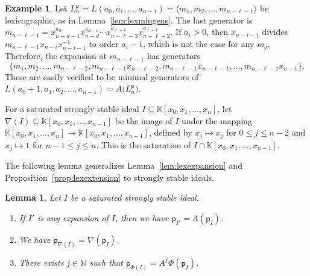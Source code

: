 \documentclass[12pt]{amsart}%
\newtheorem{lemma}[theorem]{Lemma}
\theoremstyle{definition}%
\newtheorem{example}[theorem]{Example}
\newcommand{\hp}{\mathsf{p}}%
\newcommand{\lift}{\Phi}%
\newcommand{\plus}{A}%
\newcommand{\kk}{\mathbb{K}}%
\newcommand{\NN}{\mathbb{N}}%
\begin{document}
\begin{example}%
  \label{eg:lexexpansion}
  Let $L^{\hp}_n = L(a_0, a_1, \dotsc, a_{n-1}) = \langle m_1, m_2,
  \dotsc, m_{n - \ell - 1} \rangle$ be lexicographic, as in
  Lemma~\ref{lem:lexmingens}.  The last generator is $m_{n-\ell-1} =
  x_{n-d-1}^{a_{d}} x_{n-d}^{a_{d-1}} \dotsb x_{n-\ell-3}^{a_{\ell+2}}
  x_{n-\ell-2}^{a_{\ell+1}}$.  If $a_i > 0$, then $x_{n-i-1}$ divides
  $m_{n-\ell-1} x_{n-i} x_{n-i-1}^{-1}$ to order $a_i - 1$, which is
  not the case for any $m_j$.  Therefore, the expansion at
  $m_{n-\ell-1}$ has generators
  \[
  \{ m_1, m_2, \dotsc, m_{n-\ell-2}, m_{n-\ell-1} x_{n-\ell-2},
  m_{n-\ell-1} x_{n-\ell-1}, \dotsc, m_{n-\ell-1} x_{n-1} \}.
  \]
  These are easily verified to be minimal generators of $L(a_0 + 1,
  a_1, a_2, \dotsc, a_{n-1}) = \plus \bigl( L^{\hp}_n \bigr)$.
\end{example}

For a saturated strongly stable ideal $I \subseteq \kk[x_0, x_1,
  \dotsc, x_n]$, let $\nabla \left( I \right) \subseteq \kk[x_0, x_1,
  \dotsc, x_{n-1}]$ be the image of $I$ under the mapping $\kk[x_0,
  x_1, \dotsc, x_{n}] \to \kk[x_0, x_1, \dotsc, x_{n-1}]$, defined by
$x_j \mapsto x_j$ for $0 \le j \le n-2$ and $x_j \mapsto 1$ for $n-1
\le j \le n$.  This is the saturation of $I \cap \kk[x_0, x_1, \dotsc,
  x_{n-1}]$.

The following lemma generalizes Lemma~\ref{lem:lexexpansion} and
Proposition~\ref{prop:lexextension} to strongly stable ideals.

\begin{lemma}
  \label{lem:HpolyBorel}
  Let $I$ be a saturated strongly stable ideal.
  \begin{enumerate}
  \item If $I'$ is any expansion of $I$, then we have $\hp_{I'} =
    \plus (\hp_I)$.

  \item We have $\hp_{\nabla \left( I \right)} = \nabla (\hp_I)$.

  \item There exists $j \in \NN$ such that $\hp_{\lift ( I )} =
    \plus^j \lift (\hp_I)$.
  \end{enumerate}
\end{lemma}
\end{document}
